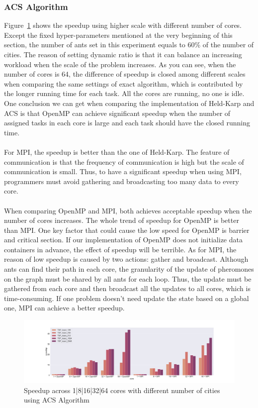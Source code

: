 \documentclass{article}
\begin{document}
\subsubsection{ACS Algorithm}
    Figure~\ref{fig:acs_openmp_mpi} shows the speedup using higher scale with different number of cores. Except the fixed hyper-parameters mentioned at the very beginning of this section, the number of ants set in this experiment equals to 60\% of the number of cities. The reason of setting dynamic ratio is that it can balance an increasing workload when the scale of the problem increases. As you can see, when the number of cores is 64, the difference of speedup is closed among different scales when comparing the same settings of exact algorithm, which is contributed by the longer running time for each task. All the cores are running, no one is idle. One conclusion we can get when comparing the implementation of Held-Karp and ACS is that OpenMP can achieve significant speedup when the number of assigned tasks in each core is large and each task should have the closed running time.\\\\
    For MPI, the speedup is better than the one of Held-Karp. The feature of communication is that the frequency of communication is high but the scale of communication is small. Thus, to have a significant speedup when using MPI, programmers must avoid gathering and broadcasting too many data to every core.\\\\
    When comparing OpenMP and MPI, both achieves acceptable speedup when the number of cores increases. The whole trend of speedup for OpenMP is better than MPI. One key factor that could cause the low speed for OpenMP is barrier and critical section. If our implementation of OpenMP does not initialize data containers in advance, the effect of speedup will be terrible. As for MPI, the reason of low speedup is caused by two actions: gather and broadcast. Although ants can find their path in each core, the granularity of the update of pheromones on the graph must be shared by all ants for each loop. Thus, the update must be gathered from each core and then broadcast all the updates to all cores, which is time-consuming. If one problem doesn't need update the state based on a global one, MPI can achieve a better speedup.
    
    \begin{figure}
        \centering
        \centerline{\includegraphics[scale=0.17]{acs_openmp_mpi.png}}
        \caption{Speedup across 1|8|16|32|64 cores with different number of cities using ACS Algorithm}
        \label{fig:acs_openmp_mpi}
    \end{figure}
\end{document}
